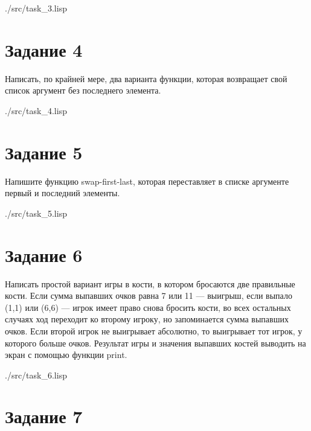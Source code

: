 \begin{lstinputlisting}[
	caption={Задание 3},
	label={lst:t3},
	style={lsp},
	]{./src/task_3.lisp}
\end{lstinputlisting}

\clearpage

\section*{Задание 4}

Написать, по крайней мере, два варианта функции, которая возвращает свой список аргумент без последнего элемента. 

\begin{lstinputlisting}[
	caption={Задание 4},
	label={lst:t4},
	style={lsp},
	]{./src/task_4.lisp}
\end{lstinputlisting}

\section*{Задание 5}

Напишите функцию swap-first-last, которая переставляет в списке аргументе первый и последний элементы.

\begin{lstinputlisting}[
	caption={Задание 5},
	label={lst:t5},
	style={lsp},
	]{./src/task_5.lisp}
\end{lstinputlisting}

\section*{Задание 6}

Написать простой вариант игры в кости, в котором бросаются две правильные кости. Если сумма выпавших очков равна 7 или 11 — выигрыш, если выпало (1,1) или (6,6) — игрок имеет право снова бросить кости, во всех остальных случаях ход переходит ко второму игроку, но запоминается сумма выпавших очков. Если второй игрок не выигрывает абсолютно, то выигрывает тот игрок, у которого больше очков. Результат игры и значения выпавших костей выводить на экран с помощью функции print. 

\begin{lstinputlisting}[
	caption={Задание 6},
	label={lst:t6},
	style={lsp},
	]{./src/task_6.lisp}
\end{lstinputlisting}

\clearpage

\section*{Задание 7}

